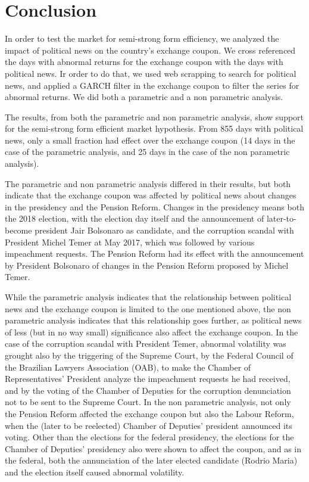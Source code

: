 \documentclass[cic,tc, english]{iiufrgs}
\begin{document}
\section{Conclusion}

    In order to test the market for semi-strong form efficiency, we analyzed the impact of political news on the country's exchange coupon. We cross referenced the days with abnormal returns for the exchange coupon with the days with political news. Ir order to do that, we used web scrapping to search for political news, and applied a GARCH filter in the exchange coupon to filter the series for abnormal returns. We did both a parametric and a non parametric analysis.

    The results, from both the parametric and non parametric analysis, show support for the semi-strong form efficient market hypothesis. From 855 days with political news, only a small fraction had effect over the exchange coupon (14 days in the case of the parametric analysis, and 25 days in the case of the non parametric analysis).

    The parametric and non parametric analysis differed in their results, but both indicate that the exchange coupon was affected by political news about changes in the presidency and the Pension Reform. Changes in the presidency means both the 2018 election, with the election day itself and the announcement of later-to-become president Jair Bolsonaro as candidate, and the corruption scandal with President Michel Temer at May 2017, which was followed by various impeachment requests. The Pension Reform had its effect with the announcement by President Bolsonaro of changes in the Pension Reform proposed by Michel Temer.

    While the parametric analysis indicates that the relationship between political news and the exchange coupon is limited to the one mentioned above, the non parametric analysis indicates that this relationship goes further, as political news of less (but in no way small) significance also affect the exchange coupon. In the case of the corruption scandal with President Temer, abnormal volatility was grought also by the triggering of the Supreme Court, by the Federal Council of the Brazilian Lawyers Association (OAB), to make the Chamber of Representatives' President analyze the impeachment requests he had received, and by the voting of the Chamber of Deputies for the corruption denunciation not to be sent to the Supreme Court. In the non parametric analysis, not only the Pension Reform affected the exchange coupon but also the Labour Reform, when the (later to be reelected) Chamber of Deputies' president announced its voting. Other than the elections for the federal presidency, the elections for the Chamber of Deputies' presidency also were shown to affect the coupon, and as in the federal, both the annunciation of the later elected candidate (Rodrio Maria) and the election itself caused abnormal volatility.
\end{document}
